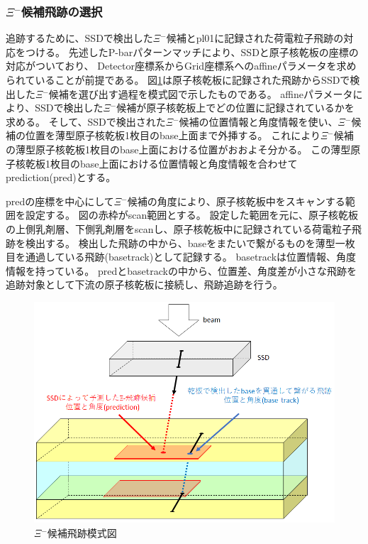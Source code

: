 \documentclass[12pt,a4paper]{jarticle}
\begin{document}
\subsubsection{$\Xi$$^-$候補飛跡の選択}
追跡するために、SSDで検出した$\Xi$$^-$候補とpl01に記録された荷電粒子飛跡の対応をつける。
先述したP-barパターンマッチにより、SSDと原子核乾板の座標の対応がついており、
Detector座標系からGrid座標系へのaffineパラメータを求められていることが前提である。
図\ref{fig:pl01_mosikizu}は原子核乾板に記録された飛跡からSSDで検出した$\Xi$$^-$候補を選び出す過程を模式図で示したものである。
affineパラメータにより、SSDで検出した$\Xi$$^-$候補が原子核乾板上でどの位置に記録されているかを求める。
そして、SSDで検出された$\Xi$$^-$候補の位置情報と角度情報を使い、$\Xi$$^-$候補の位置を薄型原子核乾板1枚目のbase上面まで外挿する。
これにより$\Xi$$^-$候補の薄型原子核乾板1枚目のbase上面における位置がおおよそ分かる。
この薄型原子核乾板1枚目のbase上面における位置情報と角度情報を合わせてprediction(pred)とする。
\par
predの座標を中心にして$\Xi$$^-$候補の角度により、原子核乾板中をスキャンする範囲を設定する。
図の赤枠がscan範囲とする。
設定した範囲を元に、原子核乾板の上側乳剤層、下側乳剤層をscanし、原子核乾板中に記録されている荷電粒子飛跡を検出する。
検出した飛跡の中から、baseをまたいで繋がるものを薄型一枚目を通過している飛跡(basetrack)として記録する。
basetrackは位置情報、角度情報を持っている。
predとbasetrackの中から、位置差、角度差が小さな飛跡を追跡対象として下流の原子核乾板に接続し、飛跡追跡を行う。
\begin{figure}[htbp]
  \centering
     \includegraphics[width=140mm]{pl01_mosikizu.png}
  \caption{$\Xi$$^-$候補飛跡模式図\label{fig:pl01_mosikizu}}
\end{figure}
\end{document}
